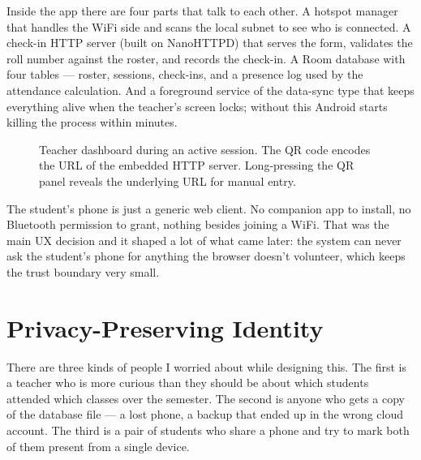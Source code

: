 \documentclass[sigconf,10pt]{acmart}
\begin{document}
Inside the app there are four parts that talk to each other. A
hotspot manager that handles the WiFi side and scans the local
subnet to see who is connected. A check-in HTTP server (built on
NanoHTTPD) that serves the form, validates the roll number against
the roster, and records the check-in. A Room database with four
tables --- roster, sessions, check-ins, and a presence log used by
the attendance calculation. And a foreground service of the
data-sync type that keeps everything alive when the teacher's
screen locks; without this Android starts killing the process
within minutes.

\begin{figure}[t]
  \centering
  \caption{Teacher dashboard during an active session. The QR code
    encodes the URL of the embedded HTTP server. Long-pressing the QR
    panel reveals the underlying URL for manual entry.}
  \label{fig:dashboard}
\end{figure}

The student's phone is just a generic web client. No companion app
to install, no Bluetooth permission to grant, nothing besides
joining a WiFi. That was the main UX decision and it shaped a lot
of what came later: the system can never ask the student's phone
for anything the browser doesn't volunteer, which keeps the trust
boundary very small.

\section{Privacy-Preserving Identity}

There are three kinds of people I worried about while designing
this. The first is a teacher who is more curious than they should
be about which students attended which classes over the semester.
The second is anyone who gets a copy of the database file --- a
lost phone, a backup that ended up in the wrong cloud account.
The third is a pair of students who share a phone and try to mark
both of them present from a single device.
\end{document}
